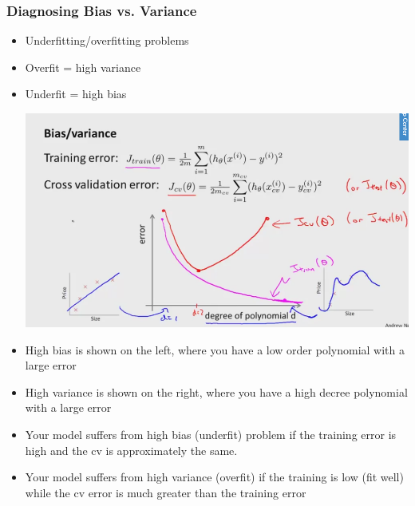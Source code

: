 \subsubsection{Diagnosing Bias vs. Variance}
\begin{itemize}[--]
	\item Underfitting/overfitting problems
	\item Overfit = high variance
	\item Underfit = high bias
	\begin{center}
		\includegraphics[scale=0.5]{sections/cs229/w7/bias_var.png}
	\end{center}

	\item High bias is shown on the left, where you have a low order polynomial with a large error
	\item High variance is shown on the right, where you have a high decree polynomial with a large error
	\item Your model suffers from high bias (underfit) problem if the training error is high and the cv is approximately the same.
	\item Your model suffers from high variance (overfit) if the training is low (fit well) while the cv error is much greater than the training error
\end{itemize}


